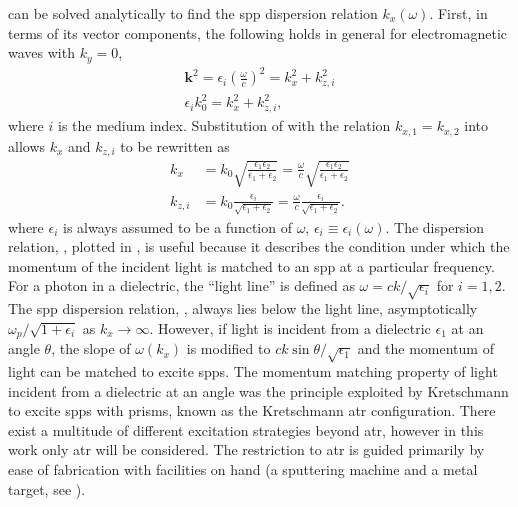  can be solved analytically to find the \gls{spp}
dispersion relation $k_x(\omega)$.
First, in terms of its vector components, the following holds in general
for electromagnetic waves with $k_y=0$,
\begin{align}
  \mathbf{k}^2=\epsilon_i {\left(\frac{\omega}{c}\right)}^2=k_x^2 + k_{z,i}^2 \\
  \epsilon_i k_0^2=k_x^2 + k_{z,i}^2,
  \label{eqn:dispersion1}
\end{align}
where $i$ is the medium index.
Substitution of  with the relation
$k_{x,1}=k_{x,2}$ into  allows
$k_x$ and $k_{z,i}$ to be rewritten as
\begin{align}
  k_x     & = k_0\sqrt{\frac{\epsilon_1 \epsilon_2}{\epsilon_1+\epsilon_2}}
  = \frac{\omega}{c}\sqrt{\frac{\epsilon_1
      \epsilon_2}{\epsilon_1+\epsilon_2}} \label{eqn:kayexx}                \\
  k_{z,i} & = k_0\frac{\epsilon_i}{\sqrt{\epsilon_1+\epsilon_2}}
  = \frac{\omega}{c}\frac{\epsilon_i}{\sqrt{\epsilon_1+\epsilon_2}}.
  \label{eqn:dandangus}
\end{align}
where $\epsilon_i$ is always assumed to be a function of $\omega$,
$\epsilon_i\equiv\epsilon_i(\omega)$.  The dispersion relation,
, plotted in , is
useful because it describes the condition under which the momentum of the
incident light is matched to an \gls{spp} at a particular frequency.  For a
photon in a dielectric, the ``light line'' is defined as $\omega = c k
  /\sqrt{\epsilon_i}$ for $i=1,2$.  The \gls{spp} dispersion relation,
, always lies below the light line,
asymptotically $\omega_p/\sqrt{1+\epsilon_i}$ as $k_x\to\infty$.
However, if light is incident from a dielectric $\epsilon_1$ at an angle
$\theta$, the slope of $\omega(k_x)$ is modified to $c k \sin
  \theta/\sqrt{\epsilon_1}$ and the momentum of light can be matched to
excite \glspl{spp}.  The momentum matching property of light incident from a
dielectric at an angle was the principle exploited by Kretschmann
\cite{kretschmann1968} to excite \glspl{spp} with prisms, known as the Kretschmann \gls{atr} configuration.  There exist a multitude of
different excitation strategies beyond \gls{atr}, however in this work only \gls{atr}
will be considered.  The restriction to \gls{atr} is guided primarily by ease of
fabrication with facilities on hand (a sputtering machine and a metal
target, see ).

